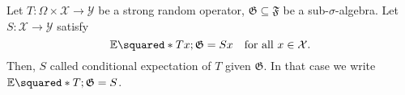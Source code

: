 \begin{defn}
    Let \( T: \Omega \times \mathcal{X} \to \mathcal{Y} \) be a strong random operator, \( \mathfrak{G} \subseteq \mathfrak{F} \) be a sub-\(\sigma\)-algebra. Let \( S: \mathcal{X} \to \mathcal{Y} \) satisfy
    \[ \mathbb{E}\squared*{Tx;\mathfrak{G}}= Sx \quad \text{for all \( x \in \mathcal{X} \)}. \]
    Then, \( S \) called conditional expectation of \( T \) given \( \mathfrak{G} \). In that case we write \( \mathbb{E}\squared*{T;\mathfrak{G}}=S \).
\end{defn}

\begin{lem}
    
\end{lem}


\begin{lem}
    
\end{lem}


\begin{thm}
    
\end{thm}


\begin{defn}
    
\end{defn}

